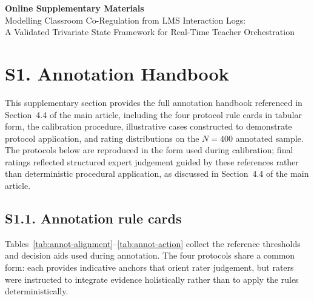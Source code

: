\documentclass[preprint,12pt,authoryear]{elsarticle}
\begin{document}
\begin{center}
{\Large \textbf{Online Supplementary Materials}}\\[4pt]
{\large Modelling Classroom Co-Regulation from LMS Interaction Logs:\\
A Validated Trivariate State Framework for Real-Time Teacher Orchestration}\\[8pt]
\end{center}

\vspace{1em}


\section*{S1. Annotation Handbook}
\label{supp:annotation}

This supplementary section provides the full annotation handbook referenced in Section~4.4 of the main article, including the four protocol rule cards in tabular form, the calibration procedure, illustrative cases constructed to demonstrate protocol application, and rating distributions on the $N = 400$ annotated sample. The protocols below are reproduced in the form used during calibration; final ratings reflected structured expert judgement guided by these references rather than deterministic procedural application, as discussed in Section~4.4 of the main article.

\subsection*{S1.1. Annotation rule cards}
\label{supp:annotation-rules}

Tables~\ref{tab:annot-alignment}--\ref{tab:annot-action} collect the reference thresholds and decision aids used during annotation. The four protocols share a common form: each provides indicative anchors that orient rater judgement, but raters were instructed to integrate evidence holistically rather than to apply the rules deterministically.
\end{document}
